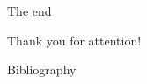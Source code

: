 
\begin{frame}{The end}
    \begin{center}
        {\huge Thank you for attention!}
    \end{center}
\end{frame}

\begin{frame}[allowframebreaks]{Bibliography}
    \printbibliography
\end{frame}

\pglastframe